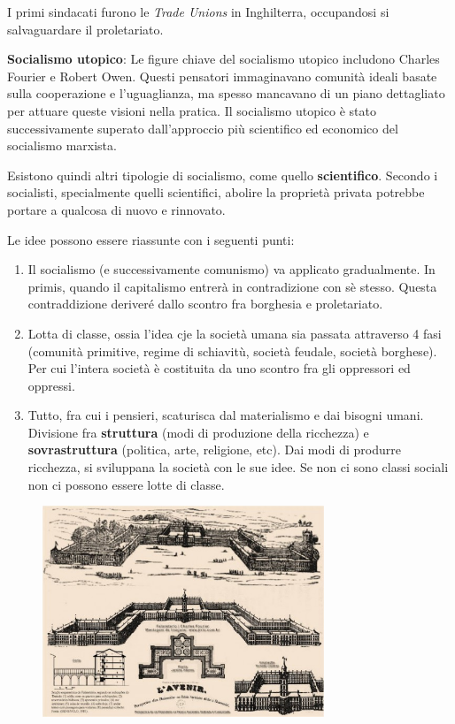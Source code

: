 \documentclass[a4paper]{article}
\begin{document}
I primi sindacati furono le \textit{Trade Unions} in Inghilterra, occupandosi si salvaguardare il proletariato.


\textbf{Socialismo utopico}: Le figure chiave del socialismo utopico includono Charles Fourier e Robert Owen.
Questi pensatori immaginavano comunità ideali basate sulla cooperazione e l'uguaglianza,
ma spesso mancavano di un piano dettagliato per attuare queste visioni nella pratica.
Il socialismo utopico è stato successivamente superato dall'approccio più scientifico
ed economico del socialismo marxista.

Esistono quindi altri tipologie di socialismo, come quello \textbf{scientifico}.
Secondo i socialisti, specialmente quelli scientifici, abolire la proprietà privata
potrebbe portare a qualcosa di nuovo e rinnovato.

Le idee possono essere riassunte con i seguenti punti:
\begin{enumerate}
    \item Il socialismo (e successivamente comunismo) va applicato gradualmente. In primis, quando il capitalismo entrerà in contradizione con sè stesso.
    Questa contraddizione deriveré dallo scontro fra borghesia e proletariato.
    \item Lotta di classe, ossia l'idea cje la società umana sia passata attraverso 4 fasi
    (comunità primitive, regime di schiavitù, società feudale, società borghese).
    Per cui l'intera società è costituita da uno scontro fra gli oppressori ed oppressi.
    \item Tutto, fra cui i pensieri, scaturisca dal materialismo e dai bisogni umani.
    Divisione fra \textbf{struttura} (modi di produzione della ricchezza)
    e \textbf{sovrastruttura} (politica, arte, religione, etc).
    Dai modi di produrre ricchezza, si sviluppana la società con le sue idee.
    Se non ci sono classi sociali non ci possono essere lotte di classe.
\end{enumerate}

\begin{figure}[h]
    \centering
    \includegraphics[width=0.75\textwidth]{./falansterio.jpg}
\end{figure}
\end{document}
